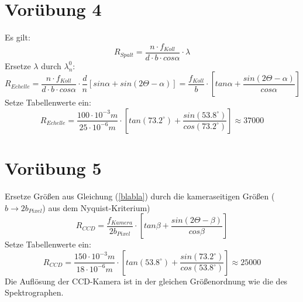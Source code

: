\documentclass[titlepage]{scrartcl}
\begin{document}
\section{Vorübung 4}
Es gilt:
\begin{equation}
R_{Spalt} = \frac{n\cdot f_{Koll}}{d\cdot b\cdot cos \alpha}\cdot \lambda
\end{equation}
Ersetze $\lambda$ durch $\lambda_n^0$:
\begin{equation}
R_{Echelle} = \frac{n\cdot f_{Koll}}{d\cdot b\cdot cos \alpha}\cdot \frac{d}{n}[sin \alpha + sin(2\Theta-\alpha)] = \frac{f_{Koll}}{b}\cdot [tan \alpha + \frac{sin(2\Theta-\alpha)}{cos \alpha}]
\label{blabla}
\end{equation}
Setze Tabellenwerte ein:
\begin{equation}
R_{Echelle} = \frac{100 \cdot 10^{-3}m}{25 \cdot 10^{-6}m}\cdot [tan (73.2^{\circ}) + \frac{sin(53.8^{\circ})}{cos (73.2^{\circ})}] \approx 37000
\end{equation}
\section{Vorübung 5}
Ersetze Größen aus Gleichung (\ref{blabla}) durch die kameraseitigen Größen ($b \rightarrow 2b_{Pixel}$) aus dem Nyquist-Kriterium)
\begin{equation}
R_{CCD} = \frac{f_{Kamera}}{2b_{Pixel}}\cdot [tan \beta + \frac{sin(2\Theta-\beta)}{cos \beta}]
\end{equation}
Setze Tabellenwerte ein:
\begin{equation}
R_{CCD} = \frac{150\cdot10^{-3}m}{18\cdot10^{-6}m}\cdot [tan (53.8^{\circ}) + \frac{sin(73.2^{\circ})}{cos (53.8^{\circ})}] \approx 25000
\end{equation}
Die Auflösung der CCD-Kamera ist in der gleichen Größenordnung wie die des Spektrographen.
\end{document}
